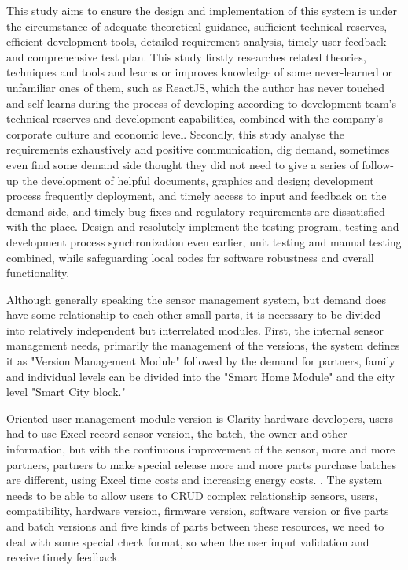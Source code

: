 This study aims to ensure the design and implementation of this system is under the circumstance of adequate theoretical guidance, sufficient technical reserves, efficient development tools, detailed requirement analysis, timely user feedback and comprehensive test plan. This study firstly researches related theories, techniques and tools and learns or improves knowledge of some never-learned or unfamiliar ones of them, such as ReactJS, which the author has never touched and self-learns during the process of developing according to development team's technical reserves and development capabilities, combined with the company's corporate culture and economic level. Secondly, this study analyse the requirements exhaustively and positive communication, dig demand, sometimes even find some demand side thought they did not need to give a series of follow-up the development of helpful documents, graphics and design; development process frequently deployment, and timely access to input and feedback on the demand side, and timely bug fixes and regulatory requirements are dissatisfied with the place. Design and resolutely implement the testing program, testing and development process synchronization even earlier, unit testing and manual testing combined, while safeguarding local codes for software robustness and overall functionality.

Although generally speaking the sensor management system, but demand does have some relationship to each other small parts, it is necessary to be divided into relatively independent but interrelated modules. First, the internal sensor management needs, primarily the management of the versions, the system defines it as "Version Management Module" followed by the demand for partners, family and individual levels can be divided into the "Smart Home Module" and the city level "Smart City block."

Oriented user management module version is Clarity hardware developers, users had to use Excel record sensor version, the batch, the owner and other information, but with the continuous improvement of the sensor, more and more partners, partners to make special release more and more parts purchase batches are different, using Excel time costs and increasing energy costs.
. The system needs to be able to allow users to CRUD complex relationship sensors, users, compatibility, hardware version, firmware version, software version or five parts and batch versions and five kinds of parts between these resources, we need to deal with some special check format, so when the user input validation and receive timely feedback.

